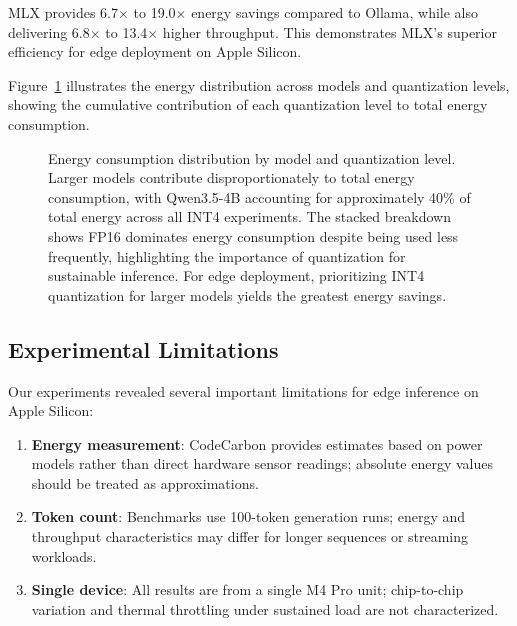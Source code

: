 \documentclass[conference]{IEEEtran}
\begin{document}
MLX provides 6.7$\times$ to 19.0$\times$ energy savings compared to Ollama, while also delivering 6.8$\times$ to 13.4$\times$ higher throughput. This demonstrates MLX's superior efficiency for edge deployment on Apple Silicon.

Figure~\ref{fig:energy_distribution} illustrates the energy distribution across models and quantization levels, showing the cumulative contribution of each quantization level to total energy consumption.

\begin{figure}[t]
\centering
{}
\caption{Energy consumption distribution by model and quantization level. Larger models contribute disproportionately to total energy consumption, with Qwen3.5-4B accounting for approximately 40\% of total energy across all INT4 experiments. The stacked breakdown shows FP16 dominates energy consumption despite being used less frequently, highlighting the importance of quantization for sustainable inference. For edge deployment, prioritizing INT4 quantization for larger models yields the greatest energy savings.}
\label{fig:energy_distribution}
\end{figure}

\subsection{Experimental Limitations}

Our experiments revealed several important limitations for edge inference on Apple Silicon:

\begin{enumerate}[leftmargin=*,nosep]
    \item \textbf{Energy measurement}: CodeCarbon provides estimates based on power models rather than direct hardware sensor readings; absolute energy values should be treated as approximations.

    \item \textbf{Token count}: Benchmarks use 100-token generation runs; energy and throughput characteristics may differ for longer sequences or streaming workloads.

    \item \textbf{Single device}: All results are from a single M4 Pro unit; chip-to-chip variation and thermal throttling under sustained load are not characterized.
\end{enumerate}
\end{document}
